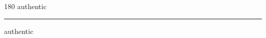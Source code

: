
\begin{frame}
\begin{center}
\begin{turn}{180}
{\fontsize{2.5cm}{1em}\selectfont authentic}
\end{turn}
\vspace{1em}\par  
\hrule
\vspace{1em}\par  
{\fontsize{2.5cm}{1em}\selectfont authentic}
\end{center}
\end{frame}
